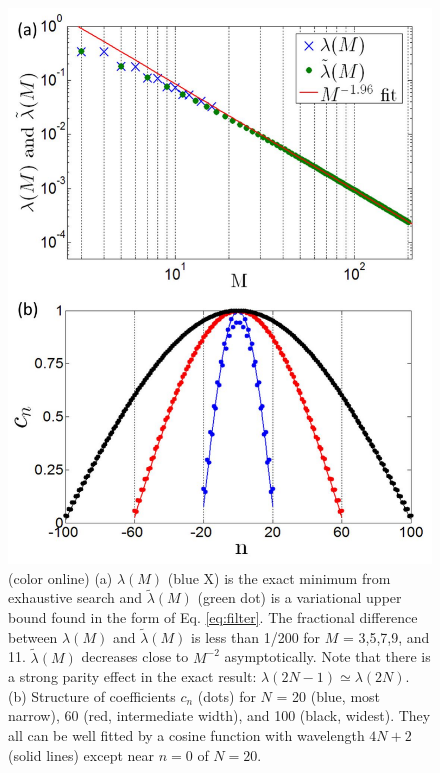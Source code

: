 \documentclass[twocolumn,superscriptaddress, prl,showpacs]{revtex4-1}
\begin{document}
\begin{figure}
\includegraphics[width=0.95\linewidth]{fig_floquet.pdf}
\centering
\caption{(color online) (a) $\lambda(M)$ (blue X) is the exact minimum from exhaustive search and $\tilde{\lambda}(M)$ (green dot) is a variational upper bound found in the form of Eq. \eqref{eq:filter}. The fractional difference between $\lambda(M)$ and $\tilde{\lambda}(M)$ is less than 1/200 for $M$ = 3,5,7,9, and 11. $\tilde{\lambda}(M)$ decreases close to $M^{-2}$ asymptotically. Note that there is a strong parity effect in the exact result: $\lambda(2N-1) \simeq \lambda(2N)$.
(b) Structure of coefficients $c_n$ (dots) for $N$ = 20 (blue, most narrow), 60 (red, intermediate width), and 100 (black, widest). They all can be well fitted by a cosine function with wavelength $4N+2$ (solid lines) except near $n = 0$ of $N = 20$. }
\label{fig:floquet}
\end{figure}
\end{document}
